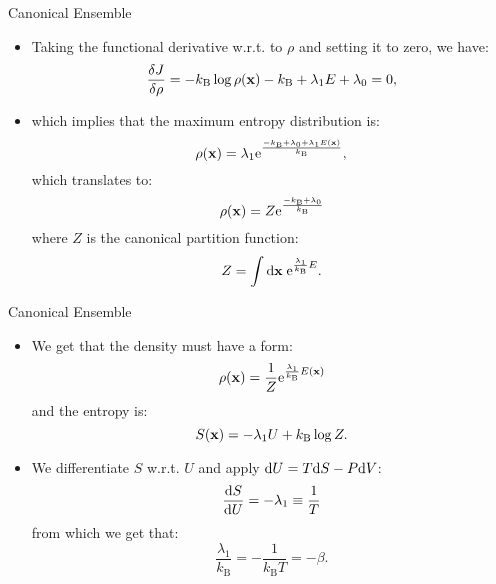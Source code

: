 \documentclass[10pt]{beamer}
\begin{document}
\begin{frame}{Canonical Ensemble}
\begin{itemize}
\setlength\itemsep{1em}
  \item Taking the functional derivative w.r.t. to $\rho$ and setting it to zero, we have:
  \begin{equation}
    \frac{\delta J}{\delta \rho} = -k_\mathrm{B} \log\rho({\bf x}) - k_\mathrm{B} + \lambda_1 E + \lambda_0 = 0,
  \end{equation}

  \item which implies that the maximum entropy distribution is:
  \begin{equation}
    \rho({\bf x}) = \lambda_1 \mathrm{e}^{\frac{-k_\mathrm{B}+\lambda_0+\lambda_1 E({\bf x}) }{ k_\mathrm{B} }},
  \end{equation}
  which translates to:
  \begin{equation}
    \rho({\bf x}) = Z \mathrm{e}^{\frac{ -k_\mathrm{B}+\lambda_0 }{ k_\mathrm{B} }}
  \end{equation}
  where $Z$ is the canonical partition function:
  \begin{equation}
    Z=\int\mathrm{d}{\bf x}\; \mathrm{e}^{\frac{\lambda_1}{k_\mathrm{B}} E}.
  \end{equation}
\end{itemize}
\end{frame}

\begin{frame}{Canonical Ensemble}
\begin{itemize}
\setlength\itemsep{1em}
  \item We get that the density must have a form:
  \begin{equation}
    \rho({\bf x}) = \frac{1}{Z}\mathrm{e}^{\frac{\lambda_1}{k_\mathrm{B}} E({\bf x})}
  \end{equation}
  and the entropy is:
  \begin{equation}
    S({\bf x}) = -\lambda_1 U + k_\mathrm{B}\log Z.
  \end{equation}

  \item We differentiate $S$ w.r.t. $U$ and apply $\mathrm{d} U = T\mathrm{d} S - P\mathrm{d} V$:
  \begin{equation}
    \frac{\mathrm{d} S}{\mathrm{d} U} = -\lambda_1 \equiv \frac{1}{T}
  \end{equation}
  from which we get that:
  \begin{equation}
    \frac{\lambda_1}{k_\mathrm{B}} = -\frac{1}{k_\mathrm{B}T} = -\beta.
  \end{equation}
\end{itemize}
\end{frame}
\end{document}
